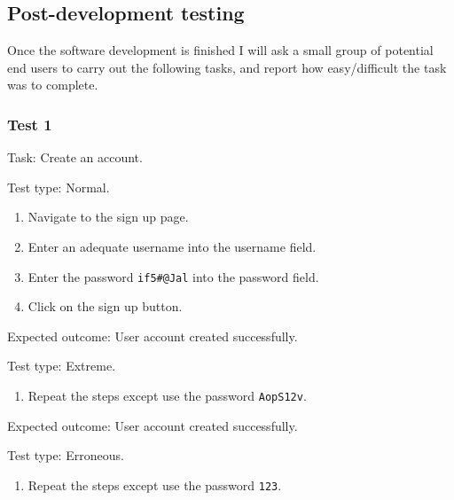 \subsection{Post-development testing}

Once the software development is finished I will ask a 
small group of potential end users to carry out the following
tasks, and report how easy/difficult the task was to complete.

\subsubsection{Test 1}

{\sffamily Task:} Create an account.\\ 

{\color{gray} \hrulefill}

{\sffamily Test type: Normal.}

\begin{enumerate}
  \item Navigate to the sign up page.
  \item Enter an adequate username into the username field.
  \item Enter the password \texttt{if5\#@Jal} into the password field.
  \item Click on the sign up button.
\end{enumerate}

{\sffamily Expected outcome:} User account created successfully. \\ 

{\color{gray} \hrulefill}

{\sffamily Test type: Extreme.}\\ 

\begin{enumerate}
\item Repeat the steps except use the password \texttt{AopS12v}.\\ 
\end{enumerate}

{\sffamily Expected outcome:} User account created successfully.\\ 

{\color{gray} \hrulefill}

{\sffamily Test type: Erroneous.} \\ 

\begin{enumerate}
\item Repeat the steps except use the password \texttt{123}.  
\end{enumerate}

